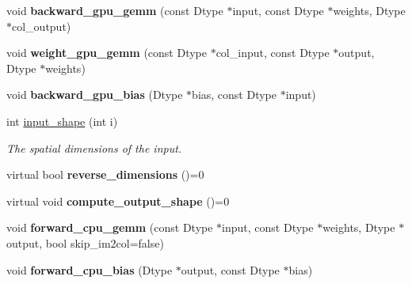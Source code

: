 \begin{DoxyCompactItemize}
void {\bfseries backward\+\_\+gpu\+\_\+gemm} (const Dtype $\ast$input, const Dtype $\ast$weights, Dtype $\ast$col\+\_\+output)
\item 
\mbox{\label{classcaffe_1_1_base_convolution_layer_a2c2e76ae5046570087f6af56180787b5}} 
void {\bfseries weight\+\_\+gpu\+\_\+gemm} (const Dtype $\ast$col\+\_\+input, const Dtype $\ast$output, Dtype $\ast$weights)
\item 
\mbox{\label{classcaffe_1_1_base_convolution_layer_abbaf526a70e5106b79d8da94e8d4aa06}} 
void {\bfseries backward\+\_\+gpu\+\_\+bias} (Dtype $\ast$bias, const Dtype $\ast$input)
\item 
\mbox{\label{classcaffe_1_1_base_convolution_layer_a6324d4ab918a7b09399aa85a8a03737d}} 
int \mbox{\hyperlink{classcaffe_1_1_base_convolution_layer_a6324d4ab918a7b09399aa85a8a03737d}{input\+\_\+shape}} (int i)
\begin{DoxyCompactList}\small\item\em The spatial dimensions of the input. \end{DoxyCompactList}\item 
\mbox{\label{classcaffe_1_1_base_convolution_layer_affa7a2b5b583afc210f0c5dfe48842c8}} 
virtual bool {\bfseries reverse\+\_\+dimensions} ()=0
\item 
\mbox{\label{classcaffe_1_1_base_convolution_layer_a552f16d43bf2470274102fe4fcde8759}} 
virtual void {\bfseries compute\+\_\+output\+\_\+shape} ()=0
\item 
\mbox{\label{classcaffe_1_1_base_convolution_layer_a2870d22074426089e31afd864b989743}} 
void {\bfseries forward\+\_\+cpu\+\_\+gemm} (const Dtype $\ast$input, const Dtype $\ast$weights, Dtype $\ast$output, bool skip\+\_\+im2col=false)
\item 
\mbox{\label{classcaffe_1_1_base_convolution_layer_a00ede6bbe48c3a6dedd21308a48f979f}} 
void {\bfseries forward\+\_\+cpu\+\_\+bias} (Dtype $\ast$output, const Dtype $\ast$bias)
\item 

\end{DoxyCompactItemize}

